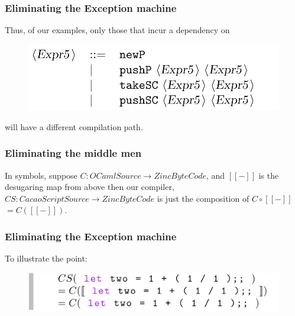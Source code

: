 \documentclass{beamer}
\newcommand{\ldb}{[\![}
\newcommand{\rdb}{]\!]}
\begin{document}
  \begin{frame}
    \frametitle{Eliminating the Exception machine} 
    Thus, of our examples, only those that incur a dependency on
    \begin{figure}[ht]
      \begin{center}        
        \includegraphics[width=\textwidth,height=0.3\textheight,keepaspectratio]{pipelinefigures/SyntaxSugarDelimCC.pdf}
      \end{center}      
    \end{figure}
    will have a different compilation path.
  \end{frame}
  \begin{frame}
    \frametitle{Eliminating the middle men}    
    In symbols, suppose
$C : OCamlSource \rightarrow ZincByteCode$, and $\ldb - \rdb$ is the
desugaring map from above then our compiler,
$CS : CacaoScriptSource \rightarrow ZincByteCode$
is just the composition of $C \circ \ldb - \rdb$ $ = C(\ldb - \rdb)$.
  \end{frame}
  \begin{frame}
    \frametitle{Eliminating the Exception machine} 
    To illustrate the point:
    \begin{figure}[ht]
      \begin{center}        
        \includegraphics[width=\textwidth,height=0.2\textheight,keepaspectratio]{pipelinefigures/CompilationPathwayCore.pdf}
      \end{center}      
    \end{figure}
    
  \end{frame}
\end{document}
